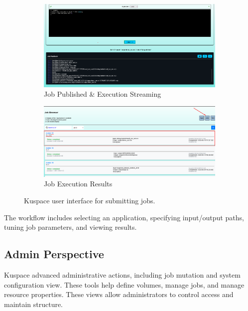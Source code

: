 \begin{figure}[!htbp]
    \begin{subfigure}[b]{0.48\textwidth}
        \includegraphics[width=\textwidth]{Images/kuspace_jobSubmission_test.png}
        \caption{Job Published \& Execution Streaming}
        \label{fig:jobsubmission}
    \end{subfigure}
    \hfill
    \begin{subfigure}[b]{0.48\textwidth}
        \includegraphics[width=\textwidth]{Images/kuspace_jobView.png}
        \caption{Job Execution Results}
        \label{fig:jobview}
    \end{subfigure}

    \caption{Kuspace user interface for submitting jobs.}
    \label{fig:kuspacejobflow}
\end{figure}

\vspace{0.5em}
\noindent
The workflow includes selecting an application, 
specifying input/output paths, tuning job parameters, 
and viewing results.


\newpage

\subsection{Admin Perspective}
Kuspace advanced administrative actions, including job mutation and system configuration view. 
These tools help define volumes, manage jobs, and manage resource properties.
These views allow administrators to control access and maintain structure.

